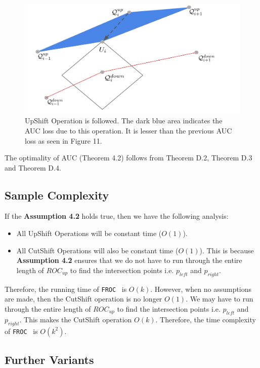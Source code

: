 \documentclass{article}
\newcommand{\ouralgo}{\texttt{FROC}}
\begin{document}
\begin{figure}[!h]
    \centering
    \includegraphics[scale =0.1]{diagrams/UpShift_proof.jpg}
    \caption{UpShift Operation is followed. The dark blue area indicates the AUC loss due to this operation. It is lesser than the previous AUC loss as seen in Figure 11.}
    \label{fig:UpShp}
\end{figure}

 The optimality of AUC (Theorem 4.2) follows from Theorem D.2, Theorem D.3 and Theorem D.4. 



\subsection{Sample Complexity}
If the \textbf{Assumption 4.2} holds true, then we have the following analysis:
\begin{itemize}
    \item All UpShift Operations will be constant time ($O(1)$).
    \item All CutShift Operations will also be constant time ($O(1)$). This is because \textbf{Assumption 4.2} ensures that we do not have to run through the entire length of $ROC_{up}$ to find the intersection points i.e. $p_{left}$ and $p_{right}$.
\end{itemize}
Therefore, the running time of \ouralgo~ is $O(k)$.
However, when no assumptions are made, then the CutShift operation is no longer $O(1)$. We may have to run through the entire length of $ROC_{up}$ to find the intersection points i.e. $p_{left}$ and $p_{right}$. This makes the CutShift operation $O(k)$. Therefore, the time complexity of \ouralgo~ is $O(k^2)$.

\subsection{Further Variants}
\end{document}
